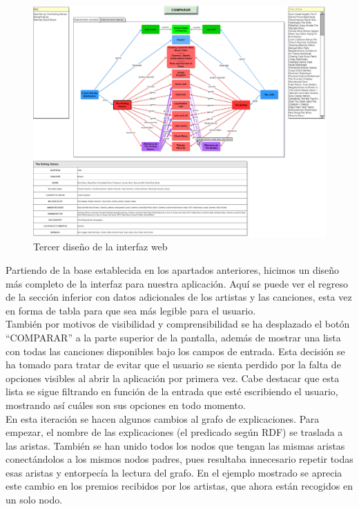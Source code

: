 \begin{figure}[h!]
	\centering
	\includegraphics[width = 1\textwidth]{Imagenes/Bitmap/Tercera Interfaz.png}
	\caption{Tercer diseño de la interfaz web}
	\label{fig:sampleImage}
\end{figure}

Partiendo de la base establecida en los apartados anteriores, hicimos un diseño más completo de la interfaz para nuestra aplicación. Aquí se puede ver el regreso de la sección inferior con datos adicionales de los artistas y las canciones, esta vez en forma de tabla para que sea más legible para el usuario.\\

También por motivos de visibilidad y comprensibilidad se ha desplazado el botón ``COMPARAR'' a la parte superior de la pantalla, además de mostrar una lista con todas las canciones disponibles bajo los campos de entrada. Esta decisión se ha tomado para tratar de evitar que el usuario se sienta perdido por la falta de opciones visibles al abrir la aplicación por primera vez. Cabe destacar que esta lista se sigue filtrando en función de la entrada que esté escribiendo el usuario, mostrando así cuáles son sus opciones en todo momento.\\

En esta iteración se hacen algunos cambios al grafo de explicaciones. Para empezar, el nombre de las explicaciones (el predicado según RDF) se traslada a las aristas. También se han unido todos los nodos que tengan las mismas aristas conectándolos a los mismos nodos padres, pues resultaba innecesario repetir todas esas aristas y entorpecía la lectura del grafo. En el ejemplo mostrado se aprecia este cambio en los premios recibidos por los artistas, que ahora están recogidos en un solo nodo.\\

